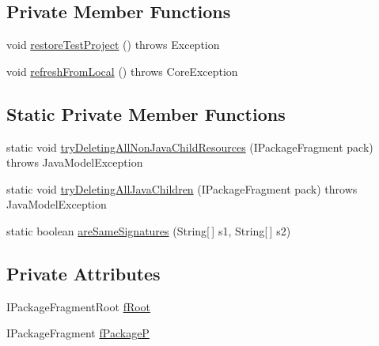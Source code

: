 \subsection*{Private Member Functions}
\begin{DoxyCompactItemize}
\item 
void \hyperlink{classorg_1_1eclipse_1_1jdt_1_1ui_1_1tests_1_1refactoring_1_1infra_1_1RefactoringTest_a14544b7bf04ace5d479f65665a486150}{restoreTestProject} ()  throws Exception 
\item 
void \hyperlink{classorg_1_1eclipse_1_1jdt_1_1ui_1_1tests_1_1refactoring_1_1infra_1_1RefactoringTest_a0979f4cec633cf7de253c116e2f6ed67}{refreshFromLocal} ()  throws CoreException 
\end{DoxyCompactItemize}
\subsection*{Static Private Member Functions}
\begin{DoxyCompactItemize}
\item 
static void \hyperlink{classorg_1_1eclipse_1_1jdt_1_1ui_1_1tests_1_1refactoring_1_1infra_1_1RefactoringTest_a3af3a96c58786acf3ed02de6f7cb25ca}{tryDeletingAllNonJavaChildResources} (IPackageFragment pack)  throws JavaModelException 
\item 
static void \hyperlink{classorg_1_1eclipse_1_1jdt_1_1ui_1_1tests_1_1refactoring_1_1infra_1_1RefactoringTest_a50d30af18e36d7598c081f86884a1518}{tryDeletingAllJavaChildren} (IPackageFragment pack)  throws JavaModelException 
\item 
static boolean \hyperlink{classorg_1_1eclipse_1_1jdt_1_1ui_1_1tests_1_1refactoring_1_1infra_1_1RefactoringTest_af7bd3033956453f05a3a56383c2bb964}{areSameSignatures} (String\mbox{[}$\,$\mbox{]} s1, String\mbox{[}$\,$\mbox{]} s2)
\end{DoxyCompactItemize}
\subsection*{Private Attributes}
\begin{DoxyCompactItemize}
\item 
IPackageFragmentRoot \hyperlink{classorg_1_1eclipse_1_1jdt_1_1ui_1_1tests_1_1refactoring_1_1infra_1_1RefactoringTest_aea3c45c88142e0a7f29b1c229cb38640}{fRoot}
\item 
IPackageFragment \hyperlink{classorg_1_1eclipse_1_1jdt_1_1ui_1_1tests_1_1refactoring_1_1infra_1_1RefactoringTest_a166a31ebb383a0c7e2efd64fdc0d7bf1}{fPackageP}
\end{DoxyCompactItemize}


